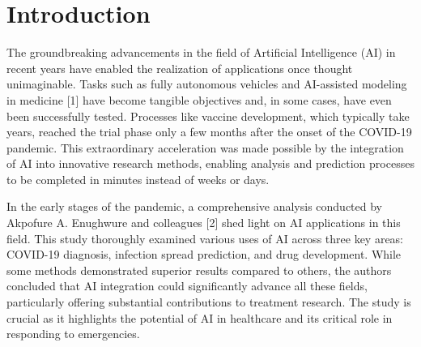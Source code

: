 \documentclass[conference]{IEEEtran}
\begin{document}


%
\IEEEpeerreviewmaketitle

\IEEEpubidadjcol

\section{Introduction}

The groundbreaking advancements in the field of Artificial Intelligence (AI) in recent years have enabled the realization of applications once thought unimaginable. Tasks such as fully autonomous vehicles and AI-assisted modeling in medicine [1] have become tangible objectives and, in some cases, have even been successfully tested. Processes like vaccine development, which typically take years, reached the trial phase only a few months after the onset of the COVID-19 pandemic. This extraordinary acceleration was made possible by the integration of AI into innovative research methods, enabling analysis and prediction processes to be completed in minutes instead of weeks or days.

In the early stages of the pandemic, a comprehensive analysis conducted by Akpofure A. Enughwure and colleagues [2] shed light on AI applications in this field. This study thoroughly examined various uses of AI across three key areas: COVID-19 diagnosis, infection spread prediction, and drug development. While some methods demonstrated superior results compared to others, the authors concluded that AI integration could significantly advance all these fields, particularly offering substantial contributions to treatment research. The study is crucial as it highlights the potential of AI in healthcare and its critical role in responding to emergencies.
\end{document}
